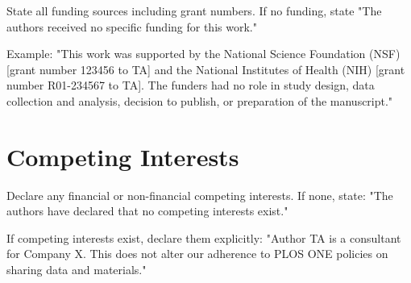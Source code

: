 \documentclass[10pt,letterpaper]{article}
\begin{document}
State all funding sources including grant numbers. If no funding, state "The authors received no specific funding for this work."

Example: "This work was supported by the National Science Foundation (NSF) [grant number 123456 to TA] and the National Institutes of Health (NIH) [grant number R01-234567 to TA]. The funders had no role in study design, data collection and analysis, decision to publish, or preparation of the manuscript."

\section*{Competing Interests}

Declare any financial or non-financial competing interests. If none, state: "The authors have declared that no competing interests exist."

If competing interests exist, declare them explicitly: "Author TA is a consultant for Company X. This does not alter our adherence to PLOS ONE policies on sharing data and materials."
\end{document}
